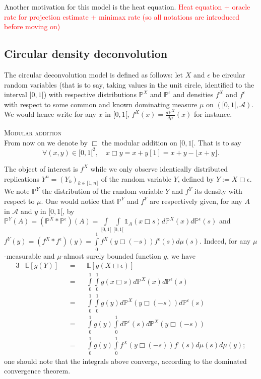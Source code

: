 Another motivation for this model is the heat equation.
\textcolor{red}{Heat equation + oracle rate for projection estimate + minimax rate (so all notations are introduced before moving on)}

\subsection{Circular density deconvolution}\label{1.4.2}

The circular deconvolution model is defined as follows: let $X$ and $\epsilon$ be circular random variables (that is to say, taking values in the unit circle, identified to the interval $[0,1[$) with respective distributions $\mathds{P}^{X}$ and $\mathds{P}^{\epsilon}$ and densities $f^{X}$ and $f^{\epsilon}$ with respect to some common and known dominating measure $\mu$ on $([0, 1[, \mathcal{A})$.
We would hence write for any $x$ in $[0, 1[$, $f^{X}(x) = \frac{d \mathds{P}^{X}}{d \mu} (x)$ for instance.

\begin{de}{\textsc{Modular addition}\\}\label{de1.4.1}
From now on we denote by $\Box$ the modular addition on $[0,1[$. That is to say
\[\forall (x, y) \in [0,1[^{2}, \quad x\Box y = x+y [1] = x + y - \lfloor x + y \rfloor.\]
\end{de}

The object of interest is $f^{X}$ while we only observe identically distributed replications $Y^{n} = \left(Y_{k}\right)_{k \in \llbracket 1, n \rrbracket}$ of the random variable $Y$, defined by $Y := X \Box \epsilon$.
We note $\mathds{P}^{Y}$ the distribution of the random variable $Y$ and $f^{Y}$ its density with respect to $\mu$.
One would notice that $\mathds{P}^{Y}$ and $f^{Y}$ are respectively given, for any $A$ in $\mathcal{A}$ and $y$ in $[0, 1[$, by $\mathds{P}^{Y}(A) = (\mathds{P}^{X} * \mathds{P}^{\epsilon})(A) = \int\limits_{[0,1[}\int\limits_{[0,1[} \mathds{1}_{A}(x \Box s)d\mathds{P}^{X}(x)d\mathds{P}^{\epsilon}(s)$ and $f^{Y}(y) = (f^{X} * f^{\epsilon})(y) = \int\limits_{0}^{1} f^{X}(y \Box (- s))f^{\epsilon}(s)d\mu(s)$.
Indeed, for any $\mu$-measurable and $\mu$-almost surely bounded function $g$, we have
\begin{alignat*}{3}
&\mathds{E}\left[g(Y)\right] &&=&& \mathds{E}\left[g(X \Box \epsilon)\right]\\
& &&=&&\int\limits_{0}^{1}\int\limits_{0}^{1} g(x \Box s) d\mathds{P}^{X}(x)d\mathds{P}^{\epsilon}(s)\\
& &&=&&\int\limits_{0}^{1}\int\limits_{0}^{1} g(y) d\mathds{P}^{X}(y \Box (-s))d\mathds{P}^{\epsilon}(s)\\
& &&=&&\int\limits_{0}^{1} g(y) \int\limits_{0}^{1} d\mathds{P}^{\epsilon}(s) d\mathds{P}^{X}(y \Box (-s))\\
& &&=&&\int\limits_{0}^{1} g(y) \int\limits_{0}^{1}f^{X}(y \Box (- s)) f^{\epsilon}(s)d\mu(s) d\mu(y);
\end{alignat*}
one should note that the integrals above converge, according to the dominated convergence theorem.

